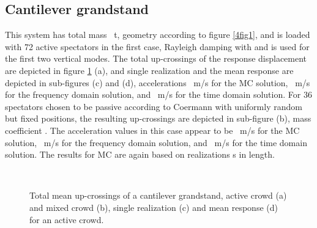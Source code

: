 \documentclass[preprint,12pt,authoryear]{elsarticle}
\begin{document}
\subsection{Cantilever grandstand}
\label{cantilever}
This system has total mass ~t, geometry according to figure \ref{4fig1}, and is loaded with 72 active spectators in the first case, Rayleigh damping with  and  is used for the first two vertical modes. The total up-crossings of the response displacement are depicted in figure \ref{4fig5} (a), and single realization and the mean response are depicted in sub-figures (c) and (d),  accelerations ~m/s for the MC solution, ~m/s for the frequency domain solution, and ~m/s for the time domain solution. For 36 spectators chosen to be passive according to Coermann with uniformly random but fixed positions, the resulting up-crossings are depicted in sub-figure (b), mass coefficient . The acceleration  values in this case appear to be ~m/s for the MC solution, ~m/s for the frequency domain solution, and ~m/s for the time domain solution. The results for MC are again based on  realizations  s in length.
\begin{figure}
	\centering
{}
\\
	\caption{Total mean up-crossings of a cantilever grandstand, active crowd (a) and mixed crowd (b), single realization (c) and mean response (d) for an active crowd.}
	\label{4fig5}
\end{figure}
\end{document}
